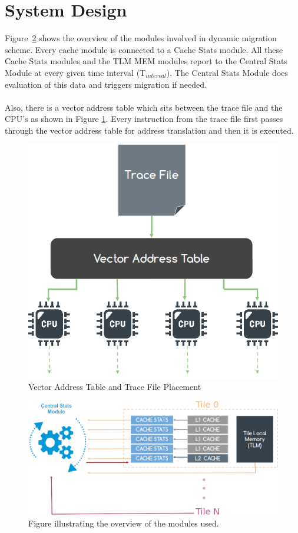 \documentclass{listhesis}
\begin{document}
\section{System Design}
Figure~\ref{fig:overviewOfSolution} shows the overview of the modules involved in dynamic migration scheme. Every cache module is connected to a Cache Stats module. All these Cache Stats modules and the TLM MEM modules report to the Central Stats Module at every given time interval (T$_{interval}$). The Central Stats Module does evaluation of this data and triggers migration if needed. \\
\\
Also, there is a vector address table which sits between the trace file and the CPU's as shown in Figure \ref{fig:traceFile}. Every instruction from the trace file first passes through the vector address table for address translation and then it is executed.\\
\begin{figure}[h!]
  \includegraphics[width=0.7\linewidth]{traceFile.png}
  \centering
  \caption{Vector Address Table and Trace File Placement}
  \label{fig:traceFile}
\end{figure}
\begin{figure}
  \includegraphics[width=\linewidth]{moduleconnections.png}
  \centering
  \caption{Figure illustrating the overview of the modules used.}
  \label{fig:overviewOfSolution}
\end{figure}
\end{document}
